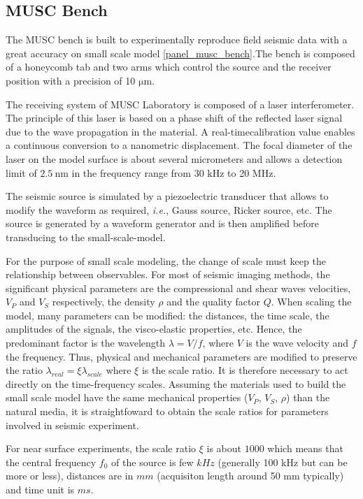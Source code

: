\documentclass[manuscript,revised]{geophysics}
\begin{document}
\subsection{MUSC Bench}

\noindent The MUSC bench \citep{Bretaudeau_SSA_2008b,Bretaudeau_SSM_2011,Bretaudeau_FWI_2013} is built to experimentally reproduce field seismic data with a great accuracy on small scale model \ref{panel_musc_bench}.The bench is composed of a honeycomb tab and two arms which control the source and the receiver position with a precision of 10 $\mathrm{\mu m}$.

\noindent The receiving system of MUSC Laboratory is composed of a laser interferometer. The principle of this laser is based on a phase shift of the reflected laser signal due to the wave propagation in the material. A real-timecalibration value enables a continuous conversion to a nanometric displacement. The focal diameter of the laser on the model surface is about several micrometers and allows a detection limit of $\mathrm{2.5\ nm}$ in the frequency range from 30 kHz to 20 MHz.

\noindent The seismic source is simulated by a piezoelectric transducer that allows to modify the waveform as required, \textit{i.e.}, Gauss source, Ricker source, etc. The source is generated by a waveform generator and is then amplified before transducing to the small-scale-model.

\noindent For the purpose of small scale modeling, the change of scale must keep the relationship between observables. For most of seismic imaging methods, the significant physical parameters are the compressional and shear waves velocities, $V_{P}$ and $V_{S}$ respectively, the density $\rho$ and the quality factor $Q$. When scaling the model, many parameters can be modified: the distances, the time scale, the amplitudes of the signals, the visco-elastic properties, etc. Hence, the predominant factor is the wavelength $\lambda = V / f$, where $V$ is the wave velocity and $f$ the frequency. Thus, physical and mechanical parameters are modified to preserve the ratio $\lambda_{real} = \xi \lambda_{scale}$ where $\xi$ is the scale ratio. It is therefore necessary to act directly on the time-frequency scales. Assuming the materials used to build the small scale model have the same mechanical properties ($V_{P}$, $V_{S}$, $\rho$) than the natural media, it is straightfoward to obtain the scale ratios for parameters involved in seismic experiment.

\noindent For near surface experiments, the scale ratio $\xi$ is about $1000$ which means that the central frequency $f_{0}$ of the source is few $kHz$ (generally 100 kHz but can be more or less), distances are in $mm$ (acquisiton length around 50 mm typically) and time unit is $ms$.
\end{document}
